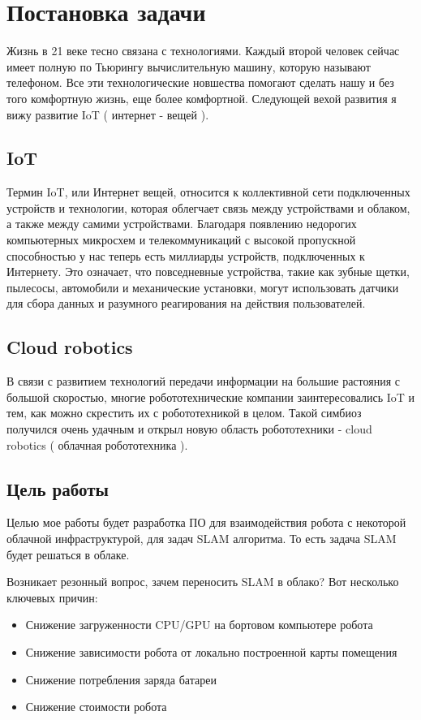 \documentclass[a4paper, 14pt]{extreport}
\begin{document}
\chapter{Постановка задачи}
\par Жизнь в 21 веке тесно связана с технологиями. Каждый второй человек сейчас имеет полную по Тьюрингу вычислительную машину, которую называют телефоном. Все эти технологические новшества помогают сделать нашу и без того комфортную жизнь, еще более комфортной. Следующей вехой развития я вижу развитие IoT ( интернет - вещей ).
\section{IoT}
\par Термин IoT, или Интернет вещей, относится к коллективной сети подключенных устройств и технологии, которая облегчает связь между устройствами и облаком, а также между самими устройствами. Благодаря появлению недорогих компьютерных микросхем и телекоммуникаций с высокой пропускной способностью у нас теперь есть миллиарды устройств, подключенных к Интернету. Это означает, что повседневные устройства, такие как зубные щетки, пылесосы, автомобили и механические установки, могут использовать датчики для сбора данных и разумного реагирования на действия пользователей.
\section{Cloud robotics}
\par В связи с развитием технологий передачи информации на большие растояния с большой скоростью, многие робототехнические компании заинтересовались IoT и тем, как можно скрестить их с робототехникой в целом. Такой симбиоз получился очень удачным и открыл новую область робототехники - cloud robotics ( облачная робототехника ).
\section{Цель работы}
\par Целью мое работы будет разработка ПО для взаимодействия робота с некоторой облачной инфраструктурой, для задач SLAM алгоритма. То есть задача SLAM будет решаться в облаке.
\par Возникает резонный вопрос, зачем переносить SLAM в облако? Вот несколько ключевых причин:
\begin{itemize}
        \item Снижение загруженности CPU/GPU на бортовом компьютере робота
        \item Снижение зависимости робота от локально построенной карты помещения
        \item Снижение потребления заряда батареи
        \item Снижение стоимости робота
\end{itemize}
\end{document}
